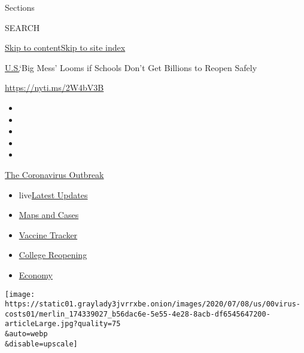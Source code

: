 Sections

SEARCH

\protect\hyperlink{site-content}{Skip to
content}\protect\hyperlink{site-index}{Skip to site index}

\href{/section/us}{U.S.}\textbar{}`Big Mess' Looms if Schools Don't Get
Billions to Reopen Safely

\url{https://nyti.ms/2W4bV3B}

\begin{itemize}
\item
\item
\item
\item
\item
\end{itemize}

\href{https://www.nytimes3xbfgragh.onion/news-event/coronavirus?action=click\&pgtype=Article\&state=default\&region=TOP_BANNER\&context=storylines_menu}{The
Coronavirus Outbreak}

\begin{itemize}
\tightlist
\item
  live\href{https://www.nytimes3xbfgragh.onion/2020/08/04/world/coronavirus-cases.html?action=click\&pgtype=Article\&state=default\&region=TOP_BANNER\&context=storylines_menu}{Latest
  Updates}
\item
  \href{https://www.nytimes3xbfgragh.onion/interactive/2020/us/coronavirus-us-cases.html?action=click\&pgtype=Article\&state=default\&region=TOP_BANNER\&context=storylines_menu}{Maps
  and Cases}
\item
  \href{https://www.nytimes3xbfgragh.onion/interactive/2020/science/coronavirus-vaccine-tracker.html?action=click\&pgtype=Article\&state=default\&region=TOP_BANNER\&context=storylines_menu}{Vaccine
  Tracker}
\item
  \href{https://www.nytimes3xbfgragh.onion/2020/08/02/us/covid-college-reopening.html?action=click\&pgtype=Article\&state=default\&region=TOP_BANNER\&context=storylines_menu}{College
  Reopening}
\item
  \href{https://www.nytimes3xbfgragh.onion/live/2020/08/04/business/stock-market-today-coronavirus?action=click\&pgtype=Article\&state=default\&region=TOP_BANNER\&context=storylines_menu}{Economy}
\end{itemize}

\texttt{[image: https://static01.graylady3jvrrxbe.onion/images/2020/07/08/us/00virus-costs01/merlin\_174339027\_b56dac6e-5e55-4e28-8acb-df6545647200-articleLarge.jpg?quality=75\\\&auto=webp\\\&disable=upscale]}

